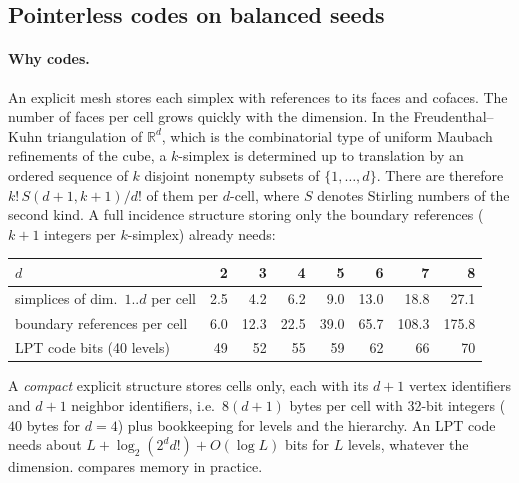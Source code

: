 \documentclass[11pt]{article}
\theoremstyle{plain}
\theoremstyle{definition}
\theoremstyle{remark}
\newcommand{\R}{\mathbb{R}}
\begin{document}
\subsection{Pointerless codes on balanced seeds}
\label{sec:lpt}

\paragraph{Why codes.}
An explicit mesh stores each simplex with references to its faces and
cofaces. The number of faces per cell grows quickly with the dimension. In
the Freudenthal--Kuhn triangulation of $\R^d$, which is the combinatorial
type of uniform Maubach refinements of the cube, a $k$-simplex is
determined up to translation by an ordered sequence of $k$ disjoint
nonempty subsets of $\{1,\dots,d\}$. There are therefore
$k!\,S(d{+}1,k{+}1)/d!$ of them per $d$-cell, where $S$ denotes Stirling
numbers of the second kind. A full incidence structure storing only the
boundary references ($k+1$ integers per $k$-simplex) already needs:
\begin{center}
\small
\begin{tabular}{@{}lrrrrrrr@{}}
\toprule
$d$ & 2 & 3 & 4 & 5 & 6 & 7 & 8 \\
\midrule
simplices of dim.\ $1..d$ per cell & 2.5 & 4.2 & 6.2 & 9.0 & 13.0 & 18.8 & 27.1 \\
boundary references per cell & 6.0 & 12.3 & 22.5 & 39.0 & 65.7 & 108.3 & 175.8 \\
LPT code bits (40 levels) & 49 & 52 & 55 & 59 & 62 & 66 & 70 \\
\bottomrule
\end{tabular}
\end{center}
A \emph{compact} explicit structure stores cells only, each with its $d+1$
vertex identifiers and $d+1$ neighbor identifiers, i.e.\ $8(d+1)$ bytes
per cell with 32-bit integers ($40$ bytes for $d=4$) plus bookkeeping for
levels and the hierarchy. An LPT code needs about
$L+\log_2(2^dd!)+O(\log L)$ bits for $L$ levels, whatever the dimension.
 compares memory in practice.
\end{document}

